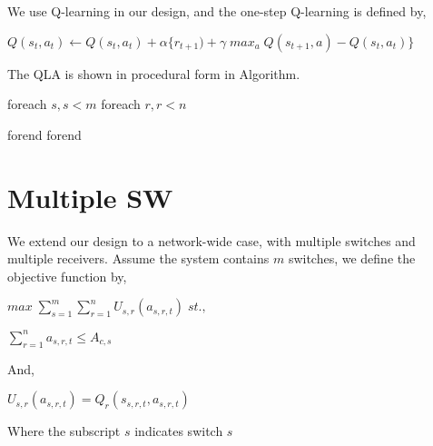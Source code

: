 \documentclass[a4paper,10pt]{article}
\begin{document}
  We use Q-learning in our design, and the one-step Q-learning is defined by,
  
  $Q(s_t,a_t) \leftarrow Q(s_t,a_t) + \alpha \{r_{t+1})+\gamma\;max_{a}\;Q(s_{t+1},a)-Q(s_t,a_t)\}$
  
  The QLA is shown in procedural form in Algorithm{}.
  
  foreach $s, s<m$
    foreach $r, r<n$
    
    forend
  forend
  
\section{Multiple SW}

  We extend our design to a network-wide case, with multiple switches and multiple receivers. Assume the system contains $m$ switches, we define the objective function by,
  
  $max \; \sum_{s = 1}^{m}\sum_{r = 1}^{n} U_{s,r}(a_{s,r,t})\;st.,$
  
  $\sum_{r = 1}^{n}a_{s,r,t} \leq A_{c,s}$
  
  And,  
  
  $U_{s,r}(a_{s,r,t}) = Q_r(s_{s,r,t}, a_{s,r,t})$
  
  Where the subscript $s$ indicates switch $s$
  
  
 
  
  
\end{document}
